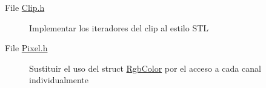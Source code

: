 \label{todo__todo000001}
\hypertarget{todo__todo000001}{}
 \begin{description}
\item[File \hyperlink{_clip_8h}{Clip.h} ]Implementar los iteradores del clip al estilo STL \end{description}


\label{todo__todo000002}
\hypertarget{todo__todo000002}{}
 \begin{description}
\item[File \hyperlink{_pixel_8h}{Pixel.h} ]Sustituir el uso del struct \hyperlink{struct_rgb_color}{RgbColor} por el acceso a cada canal individualmente \end{description}
